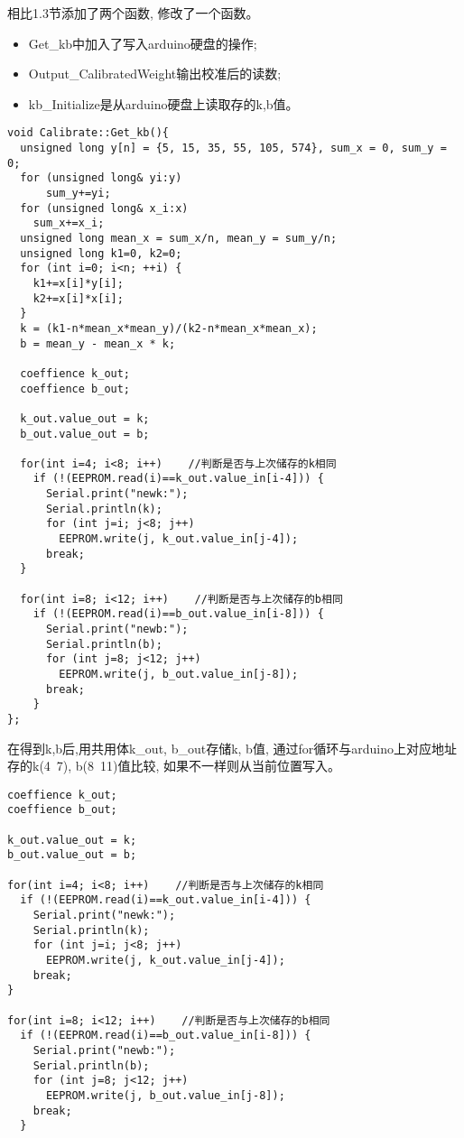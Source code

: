 \documentclass{article}
\begin{document}
相比1.3节添加了两个函数, 修改了一个函数。
\begin{itemize}
  \item Get\_kb中加入了写入arduino硬盘的操作;
  \item Output\_CalibratedWeight输出校准后的读数;
  \item kb\_Initialize是从arduino硬盘上读取存的k,b值。
\end{itemize}

\begin{lstlisting}
void Calibrate::Get_kb(){
  unsigned long y[n] = {5, 15, 35, 55, 105, 574}, sum_x = 0, sum_y = 0;
  for (unsigned long& yi:y) 
      sum_y+=yi;
  for (unsigned long& x_i:x) 
    sum_x+=x_i;
  unsigned long mean_x = sum_x/n, mean_y = sum_y/n;
  unsigned long k1=0, k2=0;
  for (int i=0; i<n; ++i) {
    k1+=x[i]*y[i];
    k2+=x[i]*x[i];
  }
  k = (k1-n*mean_x*mean_y)/(k2-n*mean_x*mean_x);
  b = mean_y - mean_x * k;

  coeffience k_out;
  coeffience b_out;

  k_out.value_out = k;
  b_out.value_out = b;

  for(int i=4; i<8; i++)    //判断是否与上次储存的k相同
    if (!(EEPROM.read(i)==k_out.value_in[i-4])) {
      Serial.print("newk:");
      Serial.println(k);
      for (int j=i; j<8; j++) 
        EEPROM.write(j, k_out.value_in[j-4]);
      break;
  }
        
  for(int i=8; i<12; i++)    //判断是否与上次储存的b相同
    if (!(EEPROM.read(i)==b_out.value_in[i-8])) {
      Serial.print("newb:");
      Serial.println(b);
      for (int j=8; j<12; j++) 
        EEPROM.write(j, b_out.value_in[j-8]);
      break;
    }
};
\end{lstlisting}

在得到k,b后,用共用体k\_out, b\_out存储k, b值, 通过for循环与arduino上对应地址存的k(4~7), b(8~11)值比较, 
如果不一样则从当前位置写入。

\begin{lstlisting}
coeffience k_out;
coeffience b_out;

k_out.value_out = k;
b_out.value_out = b;

for(int i=4; i<8; i++)    //判断是否与上次储存的k相同
  if (!(EEPROM.read(i)==k_out.value_in[i-4])) {
    Serial.print("newk:");
    Serial.println(k);
    for (int j=i; j<8; j++) 
      EEPROM.write(j, k_out.value_in[j-4]);
    break;
}
        
for(int i=8; i<12; i++)    //判断是否与上次储存的b相同
  if (!(EEPROM.read(i)==b_out.value_in[i-8])) {
    Serial.print("newb:");
    Serial.println(b);
    for (int j=8; j<12; j++) 
      EEPROM.write(j, b_out.value_in[j-8]);
    break;
  }
\end{lstlisting}
\end{document}
